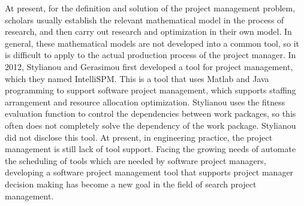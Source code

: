 At present, for the definition and solution of the project management 
problem, scholars usually establish the relevant mathematical model in the 
process of research, and then carry out research and optimization in their 
own model. In general, these mathematical models are not developed into a 
common tool, so it is difficult to apply to the actual production process of 
the project manager. In 2012, Stylianou and Gerasimou first developed a tool 
for project management, which they named IntelliSPM\cite{stylianou}. This is
a tool that uses Matlab and Java programming to support software project
management, which supports staffing arrangement and resource allocation
optimization. Stylianou uses the fitness evaluation function to control the
dependencies between work packages, so this often does not completely solve
the dependency of the work package. Stylianou did not disclose this tool.
At present, in engineering practice, the project management is still lack of
tool support. Facing the growing needs of automate the scheduling of tools
which are needed by software project managers, developing a software project
management tool that supports project manager decision making has become a
new goal in the field of search project management.

